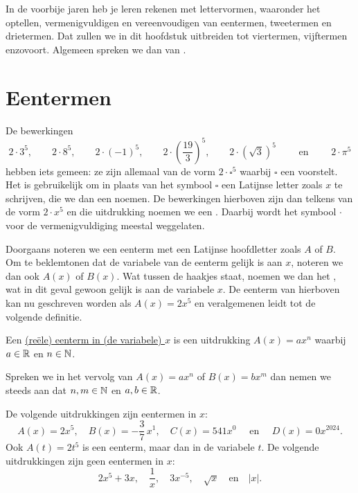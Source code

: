 \documentclass{ximera}
\begin{document}
	\author{Koen De Naeghel}
	\label{xim:veeltermen_eentermen}



In de voorbije jaren heb je leren rekenen met lettervormen, waaronder het optellen, ver\-menigvuldigen en vereenvoudigen van eentermen, tweetermen en drietermen. Dat zullen we in dit hoofdstuk uitbreiden tot viertermen, vijftermen enzovoort. Algemeen spreken we dan van .

\section{Eentermen}

De bewerkingen
\[
2\cdot 3^5, \qquad 2\cdot 8^5, \qquad 2\cdot (-1)^5, \qquad 2\cdot\left(\frac{19}{3}\right)^5, \qquad 2\cdot\left(\sqrt{3}\right)^5 \qquad \text{ en } \qquad 2 \cdot \pi^5
\]
hebben iets gemeen: ze zijn allemaal van de vorm \( 2\cdot \square^5 \) waarbij \( \square \) een  voorstelt. Het is gebruikelijk om in plaats van het symbool \( \square \) een Latijnse letter zoals \( x \) te schrijven, die we dan een  noemen. De bewerkingen hierboven zijn dan telkens van de vorm \( 2 \cdot x^5 \) en die uitdrukking noemen we een . Daarbij wordt het symbool \( \cdot \) voor de vermenigvuldiging meestal weggelaten. 

Doorgaans noteren we een eenterm met een Latijnse hoofdletter zoals \( A \) of \( B \). Om te beklemtonen dat de variabele van de eenterm gelijk is aan \( x \), noteren we dan ook \( A(x) \) of \( B(x) \). Wat tussen de haakjes staat, noemen we dan het , wat in dit geval gewoon gelijk is aan de variabele \( x \). De eenterm van hierboven kan nu geschreven worden als \( A(x) = 2x^5 \) en veralgemenen leidt tot de volgende definitie.

\begin{definition}
Een \underline{(re\"ele) eenterm in (de variabele) \( x \)} is een uitdrukking \( A(x) = ax^n \) waarbij \( a \in \mathbb{R} \) en \( n \in \mathbb{N} \). 
\end{definition}

Spreken we in het vervolg van  \( A(x) = ax^n \) of \( B(x) = bx^m \) dan nemen we steeds aan dat \( n,m\in \mathbb{N} \) en \( a,b\in \mathbb{R} \).

\begin{example}
De volgende uitdrukkingen zijn eentermen in \( x \):
\[
A(x) = 2x^5, \quad B(x) = -\frac{3}{7}\,x^1, \quad C(x) = 541x^0 \quad \text{ en } \quad D(x) = 0x^{2024}.
\]
Ook \( A(t) = 2t^5 \) is een eenterm, maar dan in de variabele \( t \). De volgende uitdrukkingen zijn geen eentermen in \( x \):
\[
2x^5+3x, \quad \frac{1}{x}, \quad 3x^{-5}, \quad \sqrt{x} \quad \text{en} \quad \left|x\right|.
\] 
\end{example}
\end{document}
